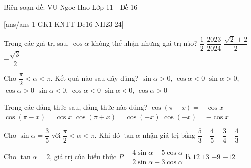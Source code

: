 \begin{name}
	{Biên soạn đề: VU Ngoc Hao}
	{Lớp 11 - Đề 16} 
\end{name}
[ans/ans-1-GK1-KNTT-De16-NH23-24]
\begin{ex}%
	Trong các giá trị sau, $\cos \alpha$ không thể nhận những giá trị nào?
	\choice
	{$\dfrac{1}{2}$}
	{$\dfrac{2023}{2024}$}
	{\True $\dfrac{\sqrt{2}+2}{2}$}
	{$-\dfrac{\sqrt{3}}{2}$}
\end{ex}
\begin{ex}%
	Cho $\dfrac{\pi}{2} < \alpha <\pi$. Kết quả nào sau đây đúng?
	\choice
	{\True $\sin \alpha >0$, $\cos \alpha <0$}
	{$\sin \alpha >0$, $\cos \alpha >0$}
	{$\sin \alpha <0$, $\cos \alpha <0$}
	{$\sin \alpha <0$, $\cos \alpha >0$}
\end{ex}
\begin{ex}%
Trong các đẳng thức sau, đẳng thức nào đúng?
	\choice
	{\True $\cos \left( \pi - x \right) = -\cos x$}
	{$\cos \left( \pi - x \right) = \cos x$}
	{$\cos \left( \pi + x \right) = \cos (-x)$}
	{$\cos (-x) = -\cos x$}
\end{ex}
\begin{ex}%
	Cho $\sin \alpha =\dfrac{3}{5}$ với $\dfrac{\pi}{2} < \alpha < \pi $. Khi đó $\tan \alpha$ nhận giá trị bằng
	\choice
	{$\dfrac{5}{3}$}
	{$- \dfrac{4}{5}$}
	{\True $- \dfrac{3}{4}$}
	{$- \dfrac{4}{3}$}
\end{ex}
\begin{ex}%
	Cho $\tan \alpha =2$, giá trị của biểu thức $P=\dfrac{4\sin \alpha +5\cos \alpha}{2\sin \alpha - 3\cos \alpha}$ là 
	\choice
	{$12$}
	{\True $13$}
	{$-9$}
	{$-12$}
\end{ex}
